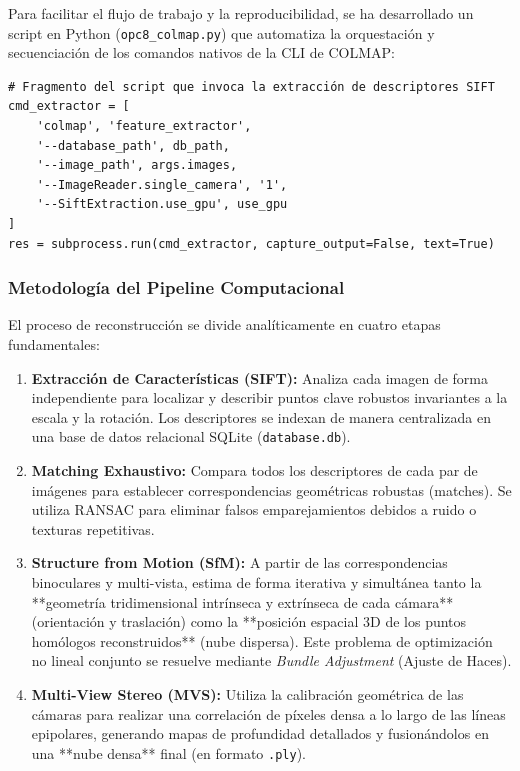 \documentclass[12pt,a4paper]{article}
\begin{document}
Para facilitar el flujo de trabajo y la reproducibilidad, se ha desarrollado un script en Python (\texttt{opc8\_colmap.py}) que automatiza la orquestación y secuenciación de los comandos nativos de la CLI de COLMAP:

\begin{verbatim}
# Fragmento del script que invoca la extracción de descriptores SIFT
cmd_extractor = [
    'colmap', 'feature_extractor',
    '--database_path', db_path,
    '--image_path', args.images,
    '--ImageReader.single_camera', '1',
    '--SiftExtraction.use_gpu', use_gpu
]
res = subprocess.run(cmd_extractor, capture_output=False, text=True)
\end{verbatim}

\subsubsection*{Metodología del Pipeline Computacional}
El proceso de reconstrucción se divide analíticamente en cuatro etapas fundamentales:
\begin{enumerate}
    \item \textbf{Extracción de Características (SIFT):} Analiza cada imagen de forma independiente para localizar y describir puntos clave robustos invariantes a la escala y la rotación. Los descriptores se indexan de manera centralizada en una base de datos relacional SQLite (\texttt{database.db}).
    \item \textbf{Matching Exhaustivo:} Compara todos los descriptores de cada par de imágenes para establecer correspondencias geométricas robustas (matches). Se utiliza RANSAC para eliminar falsos emparejamientos debidos a ruido o texturas repetitivas.
    \item \textbf{Structure from Motion (SfM):} A partir de las correspondencias binoculares y multi-vista, estima de forma iterativa y simultánea tanto la **geometría tridimensional intrínseca y extrínseca de cada cámara** (orientación y traslación) como la **posición espacial 3D de los puntos homólogos reconstruidos** (nube dispersa). Este problema de optimización no lineal conjunto se resuelve mediante \textit{Bundle Adjustment} (Ajuste de Haces).
    \item \textbf{Multi-View Stereo (MVS):} Utiliza la calibración geométrica de las cámaras para realizar una correlación de píxeles densa a lo largo de las líneas epipolares, generando mapas de profundidad detallados y fusionándolos en una **nube densa** final (en formato \texttt{.ply}).
\end{enumerate}
\end{document}

